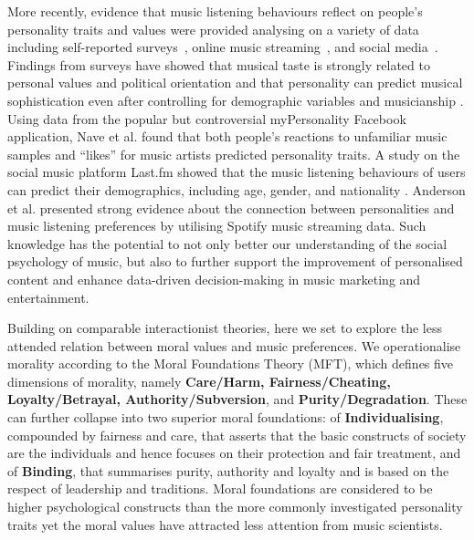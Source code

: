 \documentclass{article}
\begin{document}
More recently, evidence that music listening behaviours reflect on people’s personality traits and values %
were provided analysing on a variety of data including self-reported surveys~\cite{devenport2019predicting,gardikiotis2012rock,greenberg2015personality}, online music streaming~\cite{anderson2020just,krismayer2019predicting}, and social media~\cite{nave2018musical}. Findings from surveys have showed that musical taste is strongly related to personal values \cite{gardikiotis2012rock} and political orientation \cite{devenport2019predicting} and that personality can predict musical sophistication even after controlling for demographic variables and musicianship \cite{greenberg2015personality}. 
Using data from the popular but controversial myPersonality Facebook application, Nave et al. \cite{nave2018musical} found that both people's reactions to unfamiliar music samples and ``likes'' for music artists predicted personality traits. 
A study on the social music platform Last.fm showed that the music listening behaviours of users can predict their demographics, including age, gender, and nationality \cite{krismayer2019predicting}.
Anderson et al. \cite{anderson2020just} presented strong evidence about the connection between personalities and music listening preferences by utilising Spotify music streaming data. 
Such knowledge has the potential to not only better our understanding of the social psychology of music, but also to further support the improvement of personalised content and enhance data-driven decision-making in music marketing and entertainment. 

Building on comparable interactionist theories, here we set to explore the less attended relation between moral values and music preferences. 
We operationalise morality according to the Moral Foundations Theory (MFT)\cite{Graham2011}, which defines five dimensions of morality, namely \textbf{Care/Harm, Fairness/Cheating, Loyalty/Betrayal, Authority/Subversion}, and \textbf{Purity/Degradation}. These can further collapse into two superior moral foundations: of \textbf{Individualising}, compounded by fairness and care,  that asserts that the basic constructs of society are the individuals and hence focuses on their protection and fair treatment, and of \textbf{Binding}, that summarises purity, authority and loyalty and is based on the respect of leadership and traditions. Moral foundations are considered to be higher psychological constructs than the more commonly investigated personality traits \cite{mcadams2006new} yet the moral values have attracted less attention from music scientists.
\end{document}
